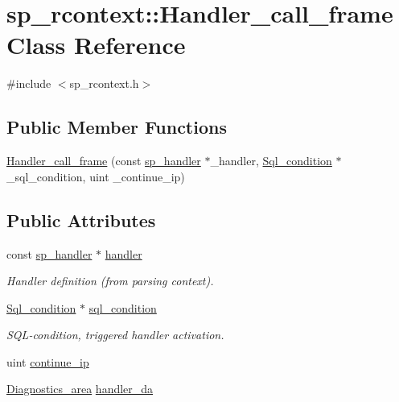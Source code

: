 \hypertarget{classsp__rcontext_1_1Handler__call__frame}{}\section{sp\+\_\+rcontext\+:\+:Handler\+\_\+call\+\_\+frame Class Reference}
\label{classsp__rcontext_1_1Handler__call__frame}


{\ttfamily \#include $<$sp\+\_\+rcontext.\+h$>$}

\subsection*{Public Member Functions}
\begin{DoxyCompactItemize}
\item 
\mbox{\hyperlink{classsp__rcontext_1_1Handler__call__frame_a1094f48f9d25990d569a254bfcdf4850}{Handler\+\_\+call\+\_\+frame}} (const \mbox{\hyperlink{classsp__handler}{sp\+\_\+handler}} $\ast$\+\_\+handler, \mbox{\hyperlink{classSql__condition}{Sql\+\_\+condition}} $\ast$\+\_\+sql\+\_\+condition, uint \+\_\+continue\+\_\+ip)
\end{DoxyCompactItemize}
\subsection*{Public Attributes}
\begin{DoxyCompactItemize}
\item 
\mbox{\label{classsp__rcontext_1_1Handler__call__frame_ab018d0da7e35087e52c9994f5a6ad156}} 
const \mbox{\hyperlink{classsp__handler}{sp\+\_\+handler}} $\ast$ \mbox{\hyperlink{classsp__rcontext_1_1Handler__call__frame_ab018d0da7e35087e52c9994f5a6ad156}{handler}}
\begin{DoxyCompactList}\small\item\em Handler definition (from parsing context). \end{DoxyCompactList}\item 
\mbox{\label{classsp__rcontext_1_1Handler__call__frame_a48d64526c53acbe670e97da339b226a4}} 
\mbox{\hyperlink{classSql__condition}{Sql\+\_\+condition}} $\ast$ \mbox{\hyperlink{classsp__rcontext_1_1Handler__call__frame_a48d64526c53acbe670e97da339b226a4}{sql\+\_\+condition}}
\begin{DoxyCompactList}\small\item\em S\+QL-\/condition, triggered handler activation. \end{DoxyCompactList}\item 
uint \mbox{\hyperlink{classsp__rcontext_1_1Handler__call__frame_a47ee7281431a1f92e77bf95156ad38ec}{continue\+\_\+ip}}
\item 
\mbox{\hyperlink{classDiagnostics__area}{Diagnostics\+\_\+area}} \mbox{\hyperlink{classsp__rcontext_1_1Handler__call__frame_a394955960efe263b6199adbc7d3309aa}{handler\+\_\+da}}
\end{DoxyCompactItemize}



